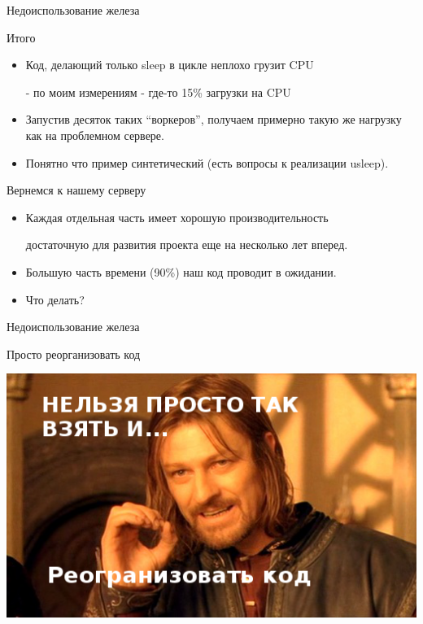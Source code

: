 \documentclass[aspectratio=169]{beamer}
\begin{document}
\begin{frame}{Недоиспользование железа}
    \begin{block}{Итого}
        \begin{itemize}
            \item Код, делающий только sleep в цикле неплохо грузит CPU
                \par - по моим измерениям - где-то 15\% загрузки на CPU
            \item Запустив десяток таких ``воркеров'', получаем
                примерно такую же нагрузку как на проблемном сервере.
            \item Понятно что пример синтетический
                (есть вопросы к реализации usleep).
        \end{itemize}
    \end{block}

    \pause
    \begin{block}{Вернемся к нашему серверу}
        \begin{itemize}
            \item Каждая отдельная часть имеет хорошую производительность
                \par достаточную для развития
                            проекта еще на несколько лет вперед.
            \item Большую часть времени (90\%) наш код проводит
                        в ожидании.

            \item Что делать?
        \end{itemize}
    \end{block}
\end{frame}

\begin{frame}{Недоиспользование железа}
    \begin{block}
        {\huge Просто реорганизовать код}
            \begin{center}
                \pause\includegraphics[scale=0.35]{img/nelzya.png}
            \end{center}
    \end{block}
\end{frame}
\end{document}
